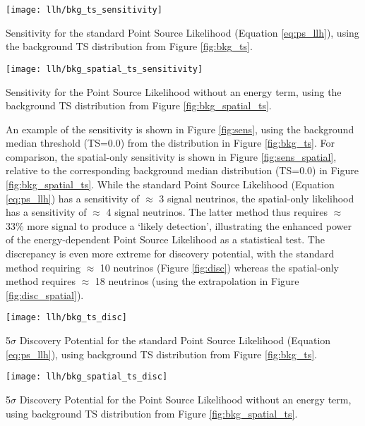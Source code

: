 \begin{marginfigure}
	\centering \texttt{[image: llh/bkg\_ts\_sensitivity]}
	\caption{Sensitivity for the standard Point Source Likelihood (Equation \ref{eq:ps_llh}),  using the background TS distribution from Figure \ref{fig:bkg_ts}.}
	\label{fig:sens}
\end{marginfigure}

\begin{marginfigure}
	\centering \texttt{[image: llh/bkg\_spatial\_ts\_sensitivity]}
	\caption{Sensitivity for the Point Source Likelihood without an energy term, using the background TS distribution from Figure \ref{fig:bkg_spatial_ts}.}
	\label{fig:sens_spatial}
\end{marginfigure}

An example of the sensitivity is shown in Figure \ref{fig:sens}, using the background median threshold (TS=0.0)  from the distribution in Figure \ref{fig:bkg_ts}. For comparison, the spatial-only sensitivity is shown in Figure \ref{fig:sens_spatial}, relative to the corresponding background median distribution (TS=0.0) in Figure \ref{fig:bkg_spatial_ts}. While the standard Point Source Likelihood (Equation \ref{eq:ps_llh}) has a sensitivity of $\approx$ 3 signal neutrinos, the spatial-only likelihood has a sensitivity of $\approx$ 4 signal neutrinos. The latter method thus requires $\approx$ 33\% more signal to produce a `likely detection', illustrating the enhanced power of the energy-dependent Point Source Likelihood as a statistical test. The discrepancy is even more extreme for discovery potential, with the standard method requiring $\approx$ 10 neutrinos (Figure \ref{fig:disc}) whereas the spatial-only method requires $\approx$ 18 neutrinos (using the extrapolation in Figure \ref{fig:disc_spatial}). 

\begin{marginfigure}
	\centering \texttt{[image: llh/bkg\_ts\_disc]}
	\caption{5$\sigma$ Discovery Potential for the standard Point Source Likelihood (Equation \ref{eq:ps_llh}), using background TS distribution from Figure \ref{fig:bkg_ts}.}
	\label{fig:disc}
\end{marginfigure}

\begin{marginfigure}
	\centering \texttt{[image: llh/bkg\_spatial\_ts\_disc]}
	\caption{5$\sigma$ Discovery Potential for the Point Source Likelihood without an energy term, using background TS distribution from Figure \ref{fig:bkg_spatial_ts}.}
	\label{fig:disc_spatial}
\end{marginfigure}

